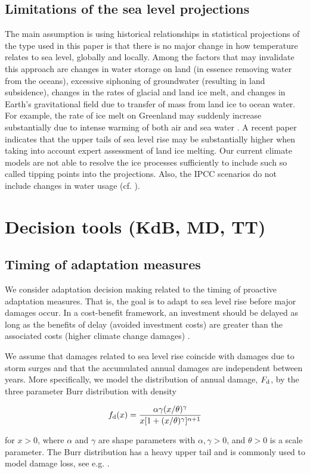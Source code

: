 \documentclass[draft,linenumbers]{agujournal}
\begin{document}
\subsection{Limitations of the sea level projections}
The main assumption is using historical relationships in statistical projections of the type used in this paper is that there is no major change in how temperature relates to sea level, globally and locally. Among the factors that may invalidate this approach are changes in water storage on land (in essence removing water from the oceans), excessive siphoning of groundwater (resulting in land subsidence), changes in the rates of glacial and land ice melt, and changes in Earth's gravitational field due to transfer of mass from land ice to ocean water. For example, the rate of ice melt on Greenland may suddenly increase substantially due to intense warming of both air and sea water \citep{bamber2013}. A recent paper \citep{jevrejeva2016} indicates that the upper tails of sea level rise may be substantially higher when taking into account expert assessment of land ice melting. Our current climate models are not able to resolve the ice processes sufficiently to include such so called tipping points into the projections. Also, the IPCC scenarios \citep{change} do not include changes in water usage (cf. \citet{wada2012}). 

\section{Decision tools {\color{blue} (KdB, MD, TT)}}
\label{decision_tools}

\subsection{Timing of adaptation measures}

We consider adaptation decision making related to the timing of proactive adaptation measures. That is, the goal is to adapt to sea level rise before major damages occur. In a cost-benefit framework, an investment should be delayed as long as the benefits of delay (avoided investment costs) are greater than the associated costs (higher climate change damages) \citep{Fankhauser&1999}.

We assume that damages related to sea level rise coincide with damages due to storm surges and that the accumulated annual damages are independent between years. More specifically, we model the distribution of annual damage, $F_{\textup{d}}$, by the three parameter Burr distribution \citep{Burr1942} with density
\begin{linenomath*}
  \begin{equation}\label{eq:Burr}
  f_{\textup{d}} (x) = \frac{\alpha \gamma (x/ \theta)^{\gamma}}{x [ 1 + (x/ \theta)^{\gamma}]^{\alpha + 1}}
  \end{equation}
\end{linenomath*}
for $x > 0$, where $\alpha$ and $\gamma$ are shape parameters with $\alpha, \gamma > 0$, and $\theta >0$ is a scale parameter. The Burr distribution has a heavy upper tail and is commonly used to model damage loss, see e.g. \cite{Klugman&2012}.
\end{document}
